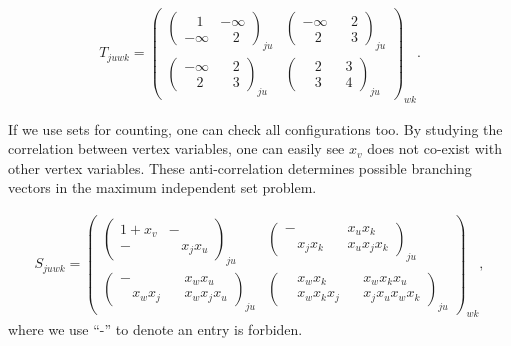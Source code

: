 \documentclass[review,onefignum,onetabnum]{siamart190516}
\newcommand{\<}{\langle}
\renewcommand{\>}{\rangle}
\begin{document}
\begin{align}
    T_{juwk} = \left(\begin{matrix}
        \left(\begin{matrix}
        ~~~~1 & -\infty \\
        -\infty & ~~~~2
        \end{matrix}\right)_{ju}&
        \left(\begin{matrix}
        -\infty & ~~~~2 \\
        ~~~~2 & ~~~~3
        \end{matrix}\right)_{ju}\\
        \left(\begin{matrix}
        -\infty & ~~~~2 \\
        ~~~~2 & ~~~~3
        \end{matrix}\right)_{ju} &
        \left(\begin{matrix}
        ~~~~2 & ~~~~3 \\
        ~~~~3 & ~~~~4
        \end{matrix}\right)_{ju}
    \end{matrix}\right)_{wk}.
\end{align}

If we use sets for counting, one can check all configurations too.
By studying the correlation between vertex variables, one can easily see $x_v$ does not co-exist with other vertex variables.
These anti-correlation determines possible branching vectors in the maximum independent set problem.

\begin{align}
    S_{juwk} = \left(\begin{matrix}
        \left(\begin{matrix}
        1+x_v & - \\
        - & ~~~~x_jx_u
        \end{matrix}\right)_{ju}&
        \left(\begin{matrix}
        - & ~~~~x_ux_k \\
        ~~~~x_jx_k & ~~~~x_ux_jx_k
        \end{matrix}\right)_{ju}\\
        \left(\begin{matrix}
        - & ~~~~x_wx_u \\
        ~~~~x_wx_j & ~~~~x_wx_jx_u
        \end{matrix}\right)_{ju} &
        \left(\begin{matrix}
        ~~~~x_wx_k & ~~~~x_wx_kx_u \\
        ~~~~x_wx_kx_j & ~~~~x_jx_ux_wx_k
        \end{matrix}\right)_{ju}
    \end{matrix}\right)_{wk},
\end{align}
where we use ``-'' to denote an entry is forbiden.
\end{document}
